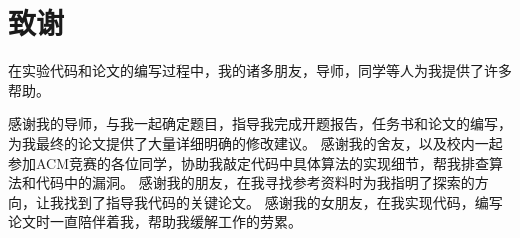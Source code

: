 
\clearpage
{}
{}
\chapter*{致谢}
在实验代码和论文的编写过程中，我的诸多朋友，导师，同学等人为我提供了许多帮助。

感谢我的导师，与我一起确定题目，指导我完成开题报告，任务书和论文的编写，为我最终的论文提供了大量详细明确的修改建议。%
感谢我的舍友，以及校内一起参加ACM竞赛的各位同学，协助我敲定代码中具体算法的实现细节，帮我排查算法和代码中的漏洞。
感谢我的朋友，在我寻找参考资料时为我指明了探索的方向，让我找到了指导我代码的关键论文。
感谢我的女朋友，在我实现代码，编写论文时一直陪伴着我，帮助我缓解工作的劳累。

